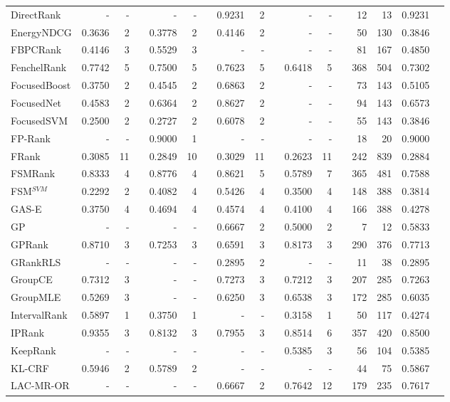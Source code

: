 \documentclass{sig-alternate}
\begin{document}
{\begin{longtable}[!hpt]{@{}lrrrrrrrrrrrrrrrr@{}}
DirectRank & - & - && - & - && 0.9231 & 2 && - & - && 12 & 13 & 0.9231 \\
EnergyNDCG & 0.3636 & 2 && 0.3778 & 2 && 0.4146 & 2 && - & - && 50 & 130 & 0.3846 \\
FBPCRank & 0.4146 & 3 && 0.5529 & 3 && - & - && - & - && 81 & 167 & 0.4850 \\
FenchelRank & 0.7742 & 5 && 0.7500 & 5 && 0.7623 & 5 && 0.6418 & 5 && 368 & 504 & 0.7302 \\
FocusedBoost & 0.3750 & 2 && 0.4545 & 2 && 0.6863 & 2 && - & - && 73 & 143 & 0.5105 \\
FocusedNet & 0.4583 & 2 && 0.6364 & 2 && 0.8627 & 2 && - & - && 94 & 143 & 0.6573 \\
FocusedSVM & 0.2500 & 2 && 0.2727 & 2 && 0.6078 & 2 && - & - && 55 & 143 & 0.3846 \\
FP-Rank & - & - && 0.9000 & 1 && - & - && - & - && 18 & 20 & 0.9000 \\
FRank & 0.3085 & 11 && 0.2849 & 10 && 0.3029 & 11 && 0.2623 & 11 && 242 & 839 & 0.2884 \\
FSMRank & 0.8333 & 4 && 0.8776 & 4 && 0.8621 & 5 && 0.5789 & 7 && 365 & 481 & 0.7588 \\
FSM$^{SVM}$ & 0.2292 & 2 && 0.4082 & 4 && 0.5426 & 4 && 0.3500 & 4 && 148 & 388 & 0.3814 \\
GAS-E & 0.3750 & 4 && 0.4694 & 4 && 0.4574 & 4 && 0.4100 & 4 && 166 & 388 & 0.4278 \\
GP & - & - && - & - && 0.6667 & 2 && 0.5000 & 2 && 7 & 12 & 0.5833 \\
GPRank & 0.8710 & 3 && 0.7253 & 3 && 0.6591 & 3 && 0.8173 & 3 && 290 & 376 & 0.7713 \\
GRankRLS & - & - && - & - && 0.2895 & 2 && - & - && 11 & 38 & 0.2895 \\
GroupCE & 0.7312 & 3 && - & - && 0.7273 & 3 && 0.7212 & 3 && 207 & 285 & 0.7263 \\
GroupMLE & 0.5269 & 3 && - & - && 0.6250 & 3 && 0.6538 & 3 && 172 & 285 & 0.6035 \\
IntervalRank & 0.5897 & 1 && 0.3750 & 1 && - & - && 0.3158 & 1 && 50 & 117 & 0.4274 \\
IPRank & 0.9355 & 3 && 0.8132 & 3 && 0.7955 & 3 && 0.8514 & 6 && 357 & 420 & 0.8500 \\
KeepRank & - & - && - & - && - & - && 0.5385 & 3 && 56 & 104 & 0.5385 \\
KL-CRF & 0.5946 & 2 && 0.5789 & 2 && - & - && - & - && 44 & 75 & 0.5867 \\
LAC-MR-OR & - & - && - & - && 0.6667 & 2 && 0.7642 & 12 && 179 & 235 & 0.7617 \\

\end{longtable}}
\end{document}
